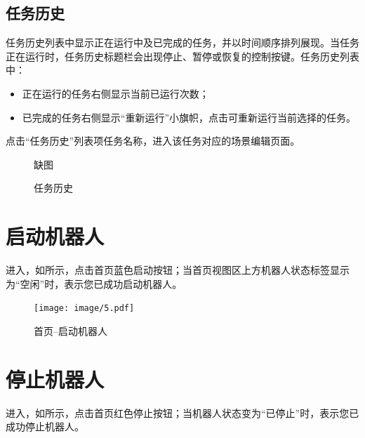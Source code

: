 \subsection{任务历史}
\label{sec:任务历史}
任务历史列表中显示正在运行中及已完成的任务，并以时间顺序排列展现。当任务正在运行时，任务历史标题栏会出现停止、暂停或恢复的控制按键。任务历史列表中：
\begin{itemize}
	\item 正在运行的任务右侧显示当前已运行次数；
	\item 已完成的任务右侧显示“重新运行”小旗帜，点击可重新运行当前选择的任务。
\end{itemize}

 	
点击“任务历史”列表项任务名称，进入该任务对应的场景编辑页面。

\begin{figure}[ht]
	\centering
	\color{red}缺图
	\caption{任务历史}
	\label{fig:任务历史}
\end{figure}

\section{启动机器人}
进入\LM ，如所示，点击首页蓝色启动按钮；当首页视图区上方机器人状态标签显示为“空闲”时，表示您已成功启动机器人。


\begin{figure}[ht]
	\centering
	\texttt{[image: image/5.pdf]}
	\caption{\LM  首页--启动机器人}
	\label{fig:启动机器人}
\end{figure}

\section{停止机器人}
进入\LM ，如所示，点击首页红色停止按钮；当机器人状态变为“已停止”时，表示您已成功停止机器人。

